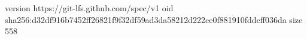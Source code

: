 version https://git-lfs.github.com/spec/v1
oid sha256:d32df916b7452ff26821f9f32df59ad3da58212d222ce0f881910fddcff036da
size 558
